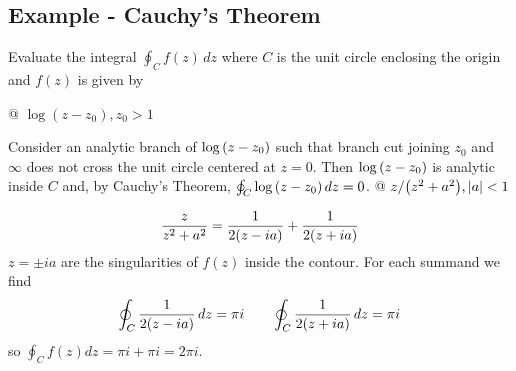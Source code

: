     \subsection{Example - Cauchy's Theorem}
    Evaluate the integral $\oint_C f(z) \, dz$ where $C$ is the unit circle
    enclosing the origin and $f(z)$ is given by
    \begin{easylist}[itemize]
        @ $\log(z - z_0), z_0 > 1$

        Consider an analytic branch of $\log{\left( z-z_0 \right)}$ such that branch
        cut joining $z_0$ and $\infty$ does not cross the unit circle
        centered at $z=0$. Then $\log{\left( z-z_0 \right)}$ is analytic inside $C$
        and, by Cauchy's Theorem, $\oint_C \log{\left( z-z_0 \right)} \, dz = 0$.
        @ $z / {\left( z^2 + a^2 \right)}, \left\lvert a \right\rvert < 1$

        \begin{align*}
            \frac{z}{z^2 + a^2} = \frac{1}{2 {\left( z-ia \right)}} +
            \frac{1}{2{\left( z+ia \right)}}
        \end{align*}
        $z=\pm ia$ are the singularities of $f(z)$ inside the contour. For
        each summand we find
        \begin{align*}
            \oint_C
            \frac{1}{2 {\left( z-ia \right)}}
            \, dz = \pi i \qquad
            \oint_C
            \frac{1}{2{\left( z+ia \right)}}
            \, dz = \pi i
        \end{align*}
        so $\oint_C f(z) dz = \pi i + \pi i = 2 \pi i$.
    \end{easylist}


